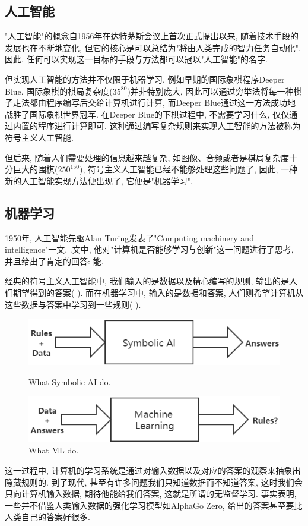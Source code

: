 \documentclass[lang=cn,11pt,a4paper]{elegantpaper}
\begin{document}
\subsection{人工智能}
\par "人工智能"的概念自1956年在达特茅斯会议\cite{Dartmouth}上首次正式提出以来, 随着技术手段的发展也在不断地变化, 但它的核心是可以总结为"将由人类完成的智力任务自动化". 因此, 任何可以实现这一目标的手段与方法都可以冠以"人工智能"的名字. 
\par 但实现人工智能的方法并不仅限于机器学习, 例如早期的国际象棋程序Deeper Blue. 国际象棋的棋局复杂度($35^{80}$\cite{artic})并非特别庞大, 因此可以通过穷举法将每一种棋子走法都由程序编写后交给计算机进行计算, 而Deeper Blue通过这一方法成功地战胜了国际象棋世界冠军. 在Deeper Blue的下棋过程中, 不需要学习什么, 仅仅通过内置的程序进行计算即可. 这种通过编写复杂规则来实现人工智能的方法被称为符号主义人工智能. 
\par 但后来, 随着人们需要处理的信息越来越复杂, 如图像、音频或者是棋局复杂度十分巨大的围棋($250^{150}$\cite{artic}), 符号主义人工智能已经不能够处理这些问题了, 因此, 一种新的人工智能实现方法便出现了, 它便是"机器学习".
\subsection{机器学习}
\par 1950年, 人工智能先驱Alan Turing发表了"Computing machinery and intelligence"一文\cite{Turing2009}, .文中, 他对"计算机是否能够学习与创新"这一问题进行了思考, 并且给出了肯定的回答: 能. 
\par 经典的符号主义人工智能中, 我们输入的是数据以及精心编写的规则, 输出的是人们期望得到的答案( ). 而在机器学习中, 输入的是数据和答案, 人们则希望计算机从这些数据与答案中学习到一些规则( ). 
\begin{figure}[htbp]
	\centering
	\begin{minipage}[t]{0.45\textwidth}
	\centering
	\includegraphics[width=1\textwidth]{Old}
	\caption{What Symbolic AI do.\label{fig:old}}
	\end{minipage}
	\begin{minipage}[t]{0.45\textwidth}
	\centering
	\includegraphics[width=1\textwidth]{Now}
	\caption{What ML do.\label{fig:now}}
	\end{minipage}
\end{figure}
\par 这一过程中, 计算机的学习系统是通过对输入数据以及对应的答案的观察来抽象出隐藏规则的. 到了现代, 甚至有许多问题我们只知道数据而不知道答案, 这时我们会只向计算机输入数据, 期待他能给我们答案, 这就是所谓的无监督学习. 事实表明, 一些并不借鉴人类输入数据的强化学习模型如AlphaGo Zero, 给出的答案甚至要比人类自己的答案好很多. 
\end{document}
